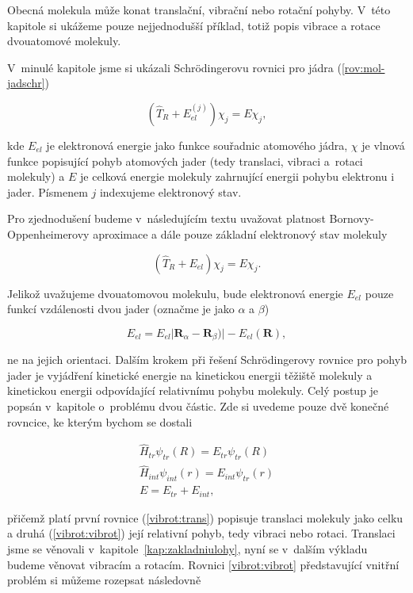 Obecná molekula může konat translační, vibrační nebo rotační pohyby. V~této kapitole si ukážeme pouze nejjednodušší příklad, totiž popis vibrace a rotace dvouatomové molekuly.

\noindent V~minulé kapitole jsme si ukázali Schrödingerovu rovnici pro jádra (\ref{rov:mol-jadschr})

\begin{displaymath}
\left(\hat{T}_R+E_{el}^{(j)}\right)\chi_j = E \chi_j,
\end{displaymath}

\noindent kde $E_{el}$ je elektronová energie jako funkce souřadnic atomového jádra, $\chi$ je vlnová funkce popisující pohyb atomových jader (tedy translaci, vibraci a~rotaci molekuly) a $E$ je celková energie molekuly zahrnující energii pohybu elektronu i jader.  Písmenem $j$ indexujeme elektronový stav.

\noindent Pro zjednodušení budeme v~následujícím textu uvažovat platnost Bornovy-Oppenheimerovy aproximace a dále pouze základní elektronový stav molekuly

\begin{displaymath}
\left(\hat{T}_R+E_{el}\right)\chi_j = E \chi_j.
\end{displaymath}
 
\noindent Jelikož uvažujeme dvouatomovou molekulu, bude elektronová energie $E_{el}$ pouze funkcí vzdálenosti dvou jader (označme je jako $\alpha$ a $\beta$)

\begin{displaymath}
E_{el}=E_{el} \vert \textbf{R}_{\alpha}-\textbf{R}_{\beta}) \vert - E_{el}(\mathbf{R}),
\end{displaymath} 

\noindent ne na jejich orientaci.
Dalším krokem při řešení Schr\"odingerovy rovnice pro pohyb jader je vyjádření kinetické energie na kinetickou energii těžiště molekuly a kinetickou energii odpovídající relativnímu pohybu molekuly. Celý postup je popsán v~kapitole o~problému dvou částic. Zde si uvedeme pouze dvě konečné rovncice, ke kterým bychom se dostali

\begin{eqnarray}
\hat{H}_{tr}\psi_{tr}(R)=E_{tr}\psi_{tr}(R)
\label{vibrot:trans}\\
\hat{H}_{int}\psi_{int}(r)=E_{int}\psi_{tr}(r)
\label{vibrot:vibrot}\\
E=E_{tr}+E_{int},
\end{eqnarray}

\noindent přičemž platí první rovnice (\ref{vibrot:trans}) popisuje translaci molekuly jako celku a druhá (\ref{vibrot:vibrot}) její relativní pohyb, tedy vibraci nebo rotaci. Translaci jsme se  věnovali v~kapitole~\ref{kap:zakladniulohy}, nyní se v~dalším výkladu budeme věnovat vibracím a rotacím. Rovnici \ref{vibrot:vibrot} představující vnitřní problém si můžeme rozepsat následovně

